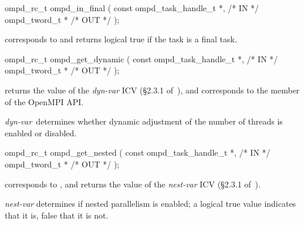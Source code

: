 \argdesc

\crossreferences


\summary

\format
\ccppspecificstart
\begin{boxedcode}
ompd\_rc\_t ompd\_in\_final (
  const ompd\_task\_handle\_t  *,                           /* IN */
  ompd\_tword\_t              *                                   /* OUT */
); 
\end{boxedcode}
\ccppspecificend

\descr
{} corresponds to  and returns
logical true if the task is a final task.

\argdesc

\crossreferences


\summary

\format
\ccppspecificstart
\begin{boxedcode}
ompd\_rc\_t ompd\_get\_dynamic (
  const ompd\_task\_handle\_t  *,                           /* IN */
  ompd\_tword\_t              *                                   /* OUT */
);
\end{boxedcode}
\ccppspecificend

\descr
{} returns the value of the
\emph{dyn-var} ICV (\S2.3.1 of~\cite{OpenMP}),
and corresponds to the  member of the OpenMPI API.

\argdesc
\emph{dyn-var}~determines whether dynamic adjustment of the number
of threads is enabled or disabled.

\crossreferences


\summary

\format
\ccppspecificstart
\begin{boxedcode}
ompd\_rc\_t ompd\_get\_nested (
  const ompd\_task\_handle\_t  *,                           /* IN */
  ompd\_tword\_t              *                                   /* OUT */
);
\end{boxedcode}
\ccppspecificend

\descr
{} corresponds to ,
and returns the value of the \emph{nest-var} ICV (\S2.3.1 of~\cite{OpenMP}).

\argdesc
\emph{nest-var} determines if nested parallelism is enabled;
a logical true value indicates that it is, false that it is not.

